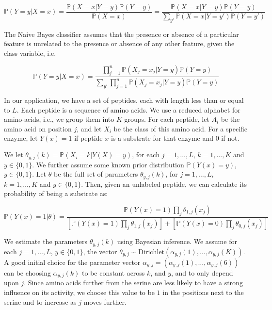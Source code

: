 \documentclass[12pt]{article}
\newcommand{\Prob}{\mathbb{P}}
\newcommand{\Dir}{\mathrm{Dirichlet}}
\begin{document}
\begin{equation*}
\Prob(Y=y|X=x)=\frac{\Prob(X=x|Y=y)\Prob(Y=y)}{\Prob(X=x)}=\frac{\Prob(X=x|Y=y)\Prob(Y=y)}{\sum_{y'}\Prob(X=x|Y=y')\Prob(Y=y')}
\end{equation*}

The Naive Bayes classifier assumes that the presence or absence of a particular feature is unrelated to the presence or absence of any other feature, given the class variable, i.e.

\begin{equation*}
\Prob(Y=y|X=x) = \frac{\prod_{j=1}^n\Prob(X_j=x_j|Y=y)\Prob(Y=y)}{\sum_{y'}\prod_{j=1}^n\Prob(X_j=x_j|Y=y)\Prob(Y=y)}
\end{equation*}

In our application, we have a set of peptides, each with length less than or equal to $L$. Each peptide is a sequence of amino acids. We use a reduced alphabet for amino-acids, i.e., we group them into $K$ groups. For each peptide, let $A_i$ be the amino acid on position $j$, and let $X_i$ be the class of this amino acid. For a specific enzyme, let $Y(x)=1$ if peptide $x$ is a substrate for that enzyme and 0 if not.

We let $\theta_{y,j}(k)=\Prob(X_i=k|Y(X)=y)$, for each $j=1,\ldots,L$, $k=1,\ldots,K$ and $y\in\{0,1\}$. We further assume some known prior distribution $\Prob(Y(x)=y)$, $y\in\{0,1\}$. Let $\theta$ be the full set of parameters $\theta_{y,j}(k)$, for $j=1,\ldots,L$, $k=1,\ldots,K$ and $y\in\{0,1\}$. Then, given an unlabeled peptide, we can calculate its probability of being a substrate as:

\begin{equation} \label{eq:model}
  \Prob\left(Y(x) = 1 | \theta\right) =
  \frac{\Prob(Y(x)=1) \prod_{j} \theta_{1,j}(x_j)}{
  \left[ \Prob(Y(x)=1) \prod_{j} \theta_{1,j}(x_j)\right] +
  \left[ \Prob(Y(x)=0) \prod_{j} \theta_{0,j}(x_j)\right]}
\end{equation}

We estimate the parameters $\theta_{y,j}(k)$ using Bayesian inference. We assume for each $j=1,\ldots,L$, $y\in\{0,1\}$, the vector $\theta_{y,j}\sim\Dir(\alpha_{y,j}(1),\ldots,\alpha_{y,j}(K))$. A good initial choice for the parameter vector $\alpha_{y,j} = (\alpha_{y,j}(1),\ldots,\alpha_{y,j}(6))$ can be choosing $\alpha_{y,j}(k)$ to be constant across $k$, and $y$, and to only depend upon $j$. Since amino acids further from the serine are less likely to have a strong influence on its activity, we choose this value to be $1$ in the positions next to the serine and to increase as $j$ moves further.
\end{document}
